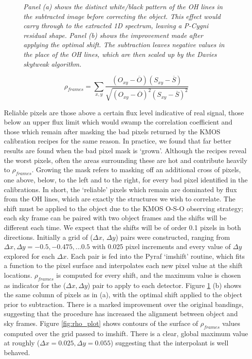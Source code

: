 \documentclass{literature}
\begin{document}
\begin{figure}[!htp]
\centering
{}
\caption{\footnotesize{\emph{Panel (a) shows the distinct white/black pattern of the OH lines in the subtracted image before correcting the object. This effect would carry through to the extracted 1D spectrum, leaving a P-Cygni residual shape. Panel (b) shows the improvement made after applying the optimal shift. The subtraction leaves negative values in the place of the OH lines, which are then scaled up by the Davies skytweak algorithm.}}}
\label{fig:column_sub}
\end{figure}   

\begin{equation}
	\label{rho_frames}
	\rho_{frames} = \sum\limits_{x,y} \frac{(O_{xy} - \overline{O})(S_{xy} - \overline{S})}{\sqrt{(O_{xy} - \overline{O})^{2}(S_{xy} - \overline{S})^{2}}}
\end{equation}



Reliable pixels are those above a certain flux level indicative of real signal, those below an upper flux limit which would swamp the correlation coefficient and those which remain after masking the bad pixels returned by the KMOS calibration recipes for the same reason. In practice, we found that far better results are found when the bad pixel mask is `grown'. Although the recipes reveal the worst pixels, often the areas surrounding these are hot and contribute heavily to $\rho_{frames}$. Growing the mask refers to masking off an additional cross of pixels, one above, below, to the left and to the right, for every bad pixel identified in the calibrations. In short, the `reliable' pixels which remain are dominated by flux from the OH lines, which are exactly the structures we wish to correlate. The shift must be applied to the object due to the KMOS O-S-O observing strategy; each sky frame can be paired with two object frames and the shifts will be different each time. We expect that the shifts will be of order 0.1 pixels in both directions. Initially a grid of ($\Delta x$, $\Delta y$) pairs were constructed, ranging from $\Delta x, \Delta y = -0.5,-0.475,...0.5$ with 0.025 pixel increments and every value of $\Delta y$ explored for each $\Delta x$. Each pair is fed into the Pyraf `imshift' routine, which fits a function to the pixel surface and interpolates each new pixel value at the shift locations. $\rho _{frames}$ is computed for every shift, and the maximum value is chosen as indicator for the ($\Delta x, \Delta y$) pair to apply to each detector. Figure \ref{fig:column_sub} (b) shows the same column of pixels as in (a), with the optimal shift applied to the object prior to subtraction. There is a marked improvement over the original bandings, suggesting that the procedure has increased the alignment between object and sky frames. Figure \ref{fig:rho_plot} shows contours of the surface of $\rho _{frames}$ values computed over the grid passed to imshift. There is a clear, global maximum value at roughly ($\Delta x = 0.025, \Delta y = 0.055$) suggesting that the interpolant is well behaved. \\
\end{document}
